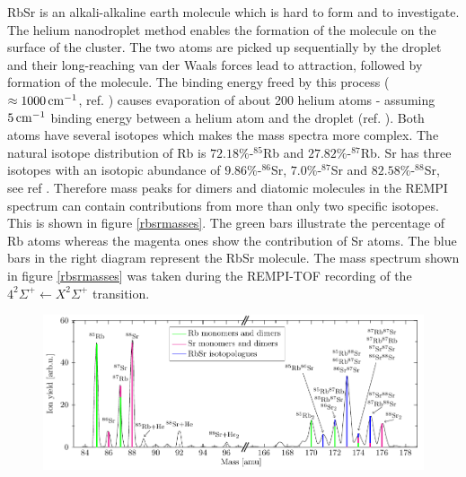 \documentclass[parskip,12pt,headsepline,a4paper] {scrbook}
\begin{document}
RbSr is an alkali-alkaline earth molecule which is hard to form and to investigate. The helium nanodroplet method enables the formation of the molecule on the surface of the cluster. The two atoms are picked up sequentially by the droplet and their long-reaching van der Waals forces lead to attraction, followed by formation of the molecule. The binding energy freed by this process ($\approx \unit[1000]{cm^{-1}}$, ref. \cite{zuchowski}) causes evaporation of about 200 helium atoms - assuming $\unit[5]{cm^{-1}}$ binding energy between a helium atom and the droplet (ref. \cite{toennis}). Both atoms have several isotopes which makes the mass spectra more complex. The natural isotope distribution of Rb is $72.18\%$-$^{85}$Rb and $27.82\%$-$^{87}$Rb. Sr has three isotopes with an isotopic abundance of $9.86\%$-$^{86}$Sr, $7.0\%$-$^{87}$Sr and $82.58\%$-$^{88}$Sr, see ref \cite{crc}. Therefore mass peaks for dimers and diatomic molecules in the REMPI spectrum can contain contributions from more than only two specific isotopes. This is shown in figure \ref{rbsrmasses}. The green bars illustrate the percentage of Rb atoms whereas the magenta ones show the contribution of Sr atoms. The blue bars in the right diagram represent the RbSr molecule. The mass spectrum shown in figure \ref{rbsrmasses} was taken during the REMPI-TOF recording of the $4 ^2\Sigma^+ \leftarrow X ^2\Sigma^+$ transition.
\begin{figure}[ht]
\centerline{
\includegraphics[width=16cm]{./resultsRbSr/rbsr_masses.pdf}}
\end{figure}
\end{document}
